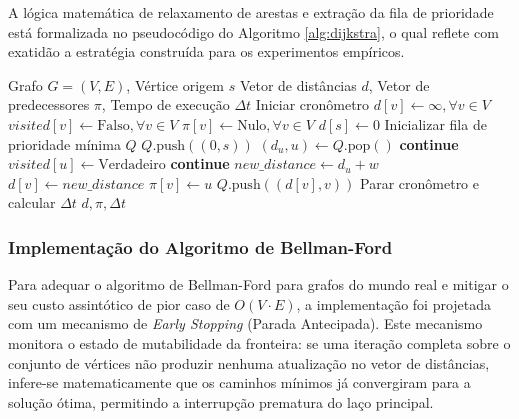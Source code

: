 \documentclass[10pt,a4paper]{article}
\begin{document}
A lógica matemática de relaxamento de arestas e extração da fila de prioridade está formalizada no pseudocódigo do Algoritmo \ref{alg:dijkstra}, o qual reflete com exatidão a estratégia construída para os experimentos empíricos.

\begin{algorithm}[H]
\caption{Algoritmo de Dijkstra com \textit{Binary Heap}}\label{alg:dijkstra}
\begin{algorithmic}[1]
\Require Grafo $G = (V, E)$, Vértice origem $s$
\Ensure Vetor de distâncias $d$, Vetor de predecessores $\pi$, Tempo de execução $\Delta t$
\State Iniciar cronômetro
\State $d[v] \gets \infty, \forall v \in V$
\State $visited[v] \gets \text{Falso}, \forall v \in V$
\State $\pi[v] \gets \text{Nulo}, \forall v \in V$
\State $d[s] \gets 0$
\State Inicializar fila de prioridade mínima $Q$
\State $Q.\text{push}((0, s))$
    \State $(d_u, u) \gets Q.\text{pop}()$
        \State \textbf{continue}
    \EndIf
    \State $visited[u] \gets \text{Verdadeiro}$
         
            \State \textbf{continue}
        \EndIf
        \State $new\_distance \gets d_u + w$
            \State $d[v] \gets new\_distance$
            \State $\pi[v] \gets u$
            \State $Q.\text{push}((d[v], v))$
        \EndIf
    \EndFor
\EndWhile
\State Parar cronômetro e calcular $\Delta t$
\State \Return $d, \pi, \Delta t$
\end{algorithmic}

\newpage

\end{algorithm}

\subsubsection{Implementação do Algoritmo de Bellman-Ford}

Para adequar o algoritmo de Bellman-Ford para grafos do mundo real e mitigar o seu custo assintótico de pior caso de $O(V \cdot E)$, a implementação foi projetada com um mecanismo de \textit{Early Stopping} (Parada Antecipada). Este mecanismo monitora o estado de mutabilidade da fronteira: se uma iteração completa sobre o conjunto de vértices não produzir nenhuma atualização no vetor de distâncias, infere-se matematicamente que os caminhos mínimos já convergiram para a solução ótima, permitindo a interrupção prematura do laço principal.
\end{document}
